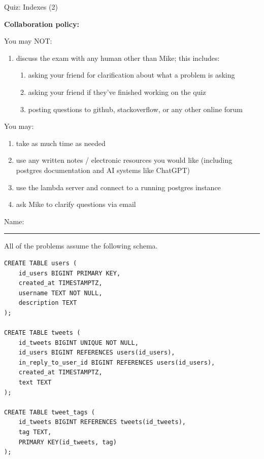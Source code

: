 \documentclass[12pt]{exam}
\theoremstyle{definition}
\begin{document}
\begin{center}
    {
\Large
    Quiz: Indexes (2)
}
\end{center}

\noindent
\textbf{Collaboration policy:} 

\vspace{0.1in}
\noindent
You may NOT:
\begin{enumerate}
    \item discuss the exam with any human other than Mike; this includes:
        \begin{enumerate}
            \item asking your friend for clarification about what a problem is asking
            \item asking your friend if they've finished working on the quiz
            \item posting questions to github, stackoverflow, or any other online forum
        \end{enumerate}
\end{enumerate}

\noindent
You may:
\begin{enumerate}
    \item take as much time as needed
    \item use any written notes / electronic resources you would like (including postgres documentation and AI systems like ChatGPT)
    \item use the lambda server and connect to a running postgres instance
    \item ask Mike to clarify questions via email
\end{enumerate}


\vspace{0.15in}

\vspace{0.25in}
\noindent
Name: 

\noindent
\rule{\textwidth}{0.1pt}
\vspace{0.15in}
\newpage



\noindent
All of the problems assume the following schema.
\begin{lstlisting}
CREATE TABLE users (
    id_users BIGINT PRIMARY KEY,
    created_at TIMESTAMPTZ,
    username TEXT NOT NULL,
    description TEXT
);

CREATE TABLE tweets (
    id_tweets BIGINT UNIQUE NOT NULL,
    id_users BIGINT REFERENCES users(id_users),
    in_reply_to_user_id BIGINT REFERENCES users(id_users),
    created_at TIMESTAMPTZ,
    text TEXT
);

CREATE TABLE tweet_tags (
    id_tweets BIGINT REFERENCES tweets(id_tweets),
    tag TEXT,
    PRIMARY KEY(id_tweets, tag)
);
\end{lstlisting}
\end{document}
